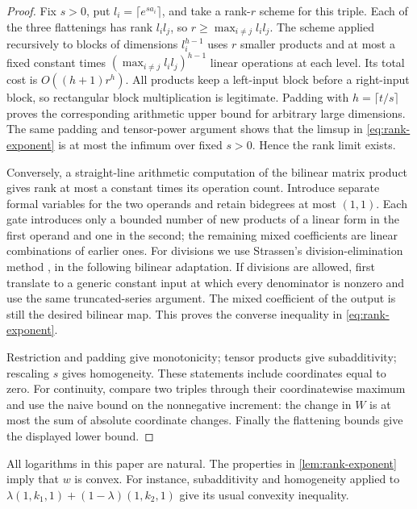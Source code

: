 \begin{proof}
Fix \(s>0\), put \(l_i=\lceil e^{sa_i}\rceil\), and take a rank-\(r\)
scheme for this triple.  Each of the three flattenings has rank
\(l_i l_j\), so \(r\ge\max_{i\ne j}l_i l_j\).
The scheme applied recursively to blocks of dimensions \(l_i^{h-1}\)
uses \(r\) smaller products and at most a fixed constant times
\((\max_{i\ne j}l_i l_j)^{h-1}\) linear operations at each level.
Its total cost is \(O((h+1)r^h)\).
All products keep a left-input block before a right-input block, so
rectangular block multiplication is legitimate.
Padding with \(h=\lceil t/s\rceil\) proves the corresponding arithmetic
upper bound for arbitrary large dimensions.
The same padding and tensor-power argument shows that the limsup in
\eqref{eq:rank-exponent} is at most the infimum over fixed \(s>0\).
Hence the rank limit exists.

Conversely, a straight-line arithmetic computation of the bilinear
matrix product gives rank at most a constant times its operation count.
Introduce separate formal variables for the two operands and retain
bidegrees at most \((1,1)\).
Each gate introduces only a bounded number of new products of a linear
form in the first operand and one in the second; the remaining mixed
coefficients are linear combinations of earlier ones.
For divisions we use Strassen's division-elimination method
\cite{strassen-division}, in the following bilinear adaptation.
If divisions are allowed, first translate to a generic constant input
at which every denominator is nonzero and use the same truncated-series
argument.  The mixed coefficient of the output is still the desired
bilinear map.
This proves the converse inequality in \eqref{eq:rank-exponent}.

Restriction and padding give monotonicity; tensor products give
subadditivity; rescaling \(s\) gives homogeneity.
These statements include coordinates equal to zero.
For continuity, compare two triples through their coordinatewise
maximum and use the naive bound on the nonnegative increment:
the change in \(W\) is at most the sum of absolute coordinate changes.
Finally the flattening bounds give the displayed lower bound.
\end{proof}

All logarithms in this paper are natural.
The properties in \cref{lem:rank-exponent} imply that \(w\) is convex.
For instance, subadditivity and homogeneity applied to
\(\lambda(1,k_1,1)+(1-\lambda)(1,k_2,1)\) give its usual convexity
inequality.

